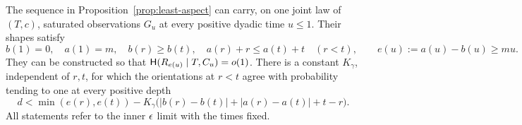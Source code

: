 \begin{proposition}
\label{prop:saturated-path}
The sequence in Proposition~\ref{prop:least-aspect} can carry, on one
joint law of $(T,c)$, saturated observations $G_u$ at every positive
dyadic time $u\le1$.  Their shapes satisfy
\[
 b(1)=0,\quad a(1)=m,\quad
 b(r)\ge b(t),\quad a(r)+r\le a(t)+t\quad(r<t),
 \qquad e(u):=a(u)-b(u)\ge mu.
\]
They can be constructed so that
$\mathsf H(R_{e(u)}\mid T,C_u)=o(1)$.  There is a constant $K_\gamma$,
independent of $r,t$, for which the orientations at $r<t$ agree with
probability tending to one at every positive depth
\begin{equation}
 d<\min(e(r),e(t))-K_\gamma
       \bigl(|b(r)-b(t)|+|a(r)-a(t)|+t-r\bigr).
 \label{eq:classical-coherence}
\end{equation}
All statements refer to the inner $\epsilon$ limit with the times fixed.
\end{proposition}
